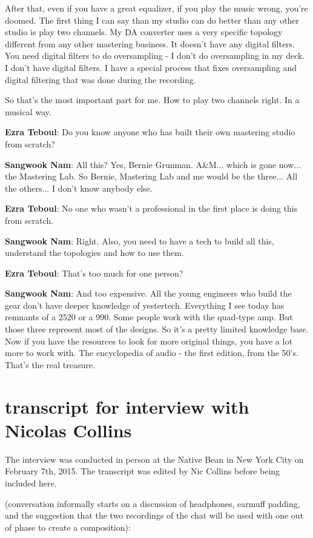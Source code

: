 After that, even if you have a great equalizer, if you play the music wrong, you're doomed. The first thing I can say than my studio can do better than any other studio is play two channels. My DA converter uses a very specific topology different from any other mastering business. It doesn't have any digital filters. You need digital filters to do oversampling - I don't do oversampling in my deck. I don't have digital filters. I have a special process that fixes oversampling and digital filtering that was done during the recording.

So that's the most important part for me. How to play two channels right. In a musical way.

\textbf{Ezra Teboul}: Do you know anyone who has built their own mastering studio from scratch?

\textbf{Sangwook Nam}: All this? Yes, Bernie Grunman. A\&M... which is gone now... the Mastering Lab. So Bernie, Mastering Lab and me would be the three... All the others... I don't know anybody else.

\textbf{Ezra Teboul}: No one who wasn't a professional in the first place is doing this from scratch.

\textbf{Sangwook Nam}: Right. Also, you need to have a tech to build all this, understand the topologies and how to use them.

\textbf{Ezra Teboul}: That's too much for one person?

\textbf{Sangwook Nam}: And too expensive. All the young engineers who build the gear don't have deeper knowledge of yestertech. Everything I see today has remnants of a 2520 or a 990. Some people work with the quad-type amp. But those three represent most of the designs. So it's a pretty limited knowledge base. Now if you have the resources to look for more original things, you have a lot more to work with. The encyclopedia of audio - the first edition, from the 50's. That's the real treasure.

\newpage

\clearpage 
\section{transcript for interview with Nicolas Collins}

The interview was conducted in person at the Native Bean in New York City on February 7th, 2015. The transcript was edited by Nic Collins before being included here.  
					
(conversation informally starts on a discussion of headphones, earmuff padding, and the suggestion that the two recordings of the chat will be used with one out of phase to create a composition):
					
